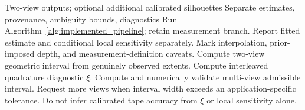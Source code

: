\documentclass[journal]{IEEEtran}
\begin{document}
\begin{algorithm}[!t]
\caption{Proposed Theory-Guided Audit (Not Implemented)}
\label{alg:decision_framework}
\begin{algorithmic}[1]
\REQUIRE Two-view outputs; optional additional calibrated silhouettes
\ENSURE Separate estimates, provenance, ambiguity bounds, diagnostics
\STATE Run Algorithm~\ref{alg:implemented_pipeline}; retain measurement branch.
\STATE Report fitted estimate and conditional local sensitivity separately.
\STATE Mark interpolation, prior-imposed depth, and measurement-definition caveats.
\STATE Compute two-view geometric interval from genuinely observed extents.
\STATE Compute interleaved quadrature diagnostic $\xi$.
\STATE Compute and numerically validate multi-view admissible interval.
\STATE Request more views when interval width exceeds an application-specific tolerance.
\ENDIF
\STATE Do not infer calibrated tape accuracy from $\xi$ or local sensitivity alone.
\ENDFOR
\end{algorithmic}
\end{algorithm}
\end{document}
